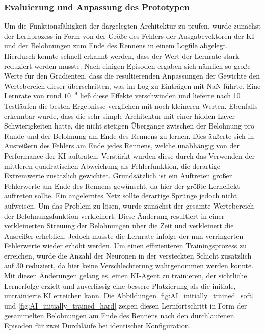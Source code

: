 \subsubsection{Evaluierung und Anpassung des Prototypen}
Um die Funktionsfähigkeit der dargelegten Architektur zu prüfen, wurde zunächst der Lernprozess in Form von der Größe des Fehlers der Ausgabevektoren der KI und der Belohnungen zum Ende des Rennens in einem Logfile abgelegt. Hierdurch konnte schnell erkannt werden, dass der Wert der Lernrate stark reduziert werden musste. Nach einigen Episoden ergaben sich nämlich so große Werte für den Gradienten, dass die resultierenden Anpassungen der Gewichte den Wertebereich dieser überschritten, was im Log zu Einträgen mit NaN führte. Eine Lernrate von rund \(10^{-9}\) ließ diese Effekte verschwinden und lieferte nach 10 Testläufen die besten Ergebnisse verglichen mit noch kleineren Werten. Ebenfalls erkennbar wurde, dass die sehr simple Architektur mit einer hidden-Layer Schwierigkeiten hatte, die nicht stetigen Übergänge zwischen der Belohnung pro Runde und der Belohnung am Ende des Rennens zu lernen. Dies äußerte sich in Ausreißern des Fehlers am Ende jedes Rennens, welche unabhängig von der Performance der KI auftraten. Verstärkt wurden diese durch das Verwenden der mittleren quadratischen Abweichung als Fehlerfunktion, die derartige Extremwerte zusätzlich gewichtet. Grundsätzlich ist ein Auftreten großer Fehlerwerte am Ende des Rennens gewünscht, da hier der größte Lerneffekt auftreten sollte. Ein angelerntes Netz sollte derartige Sprünge jedoch nicht aufweisen. Um das Problem zu lösen, wurde zunächst der gesamte Wertebereich der Belohnungsfunktion verkleinert. Diese Änderung resultiert in einer verkleinerten Streuung der Belohnungen über die Zeit und verkleinert die Ausreißer erheblich. Jedoch musste die Lernrate infolge der nun verringerten Fehlerwerte wieder erhöht werden. Um einen effizienteren Trainingsprozess zu erreichen, wurde die Anzahl der Neuronen in der versteckten Schicht zusätzlich auf 30 reduziert, da hier keine Verschlechterung wahrgenommen werden konnte. Mit diesen Änderungen gelang es, einen KI-Agent zu trainieren, der sichtliche Lernerfolge erzielt und zuverlässig eine bessere Platzierung als die initiale, untrainierte KI erreichen kann. Die Abbildungen \ref{fig:AI_initially_trained_soft} und \ref{fig:AI_initially_trained_hard} zeigen diesen Lernfortschritt in Form der gesammelten Belohnungen am Ende des Rennens nach den durchlaufenen Episoden für zwei Durchläufe bei identischer Konfiguration.
